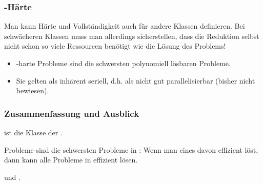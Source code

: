\documentclass[onlymath]{beamer}
\begin{document}
\begin{frame}\frametitle{-Härte}

Man kann Härte und Vollständigkeit auch für andere Klassen definieren. Bei schwächeren Klassen
muss man allerdings sicherstellen, dass die Reduktion selbst nicht schon so viele Ressourcen benötigt wie
die Lösung des Problems!

\pause

\begin{itemize}
\item {}-harte Probleme sind die schwersten polynomiell lösbaren Probleme.
\item Sie gelten als inhärent seriell, d.h. als nicht gut parallelisierbar (bisher nicht bewiesen).
\end{itemize}\pause


\end{frame}


\begin{frame}\frametitle{Zusammenfassung und Ausblick}

 ist die Klasse der .
\bigskip

 Probleme sind die schwersten Probleme in : Wenn man eines davon effizient löst, dann kann alle Probleme in  effizient lösen.
\bigskip

 und .
\bigskip


\end{frame}
\end{document}
